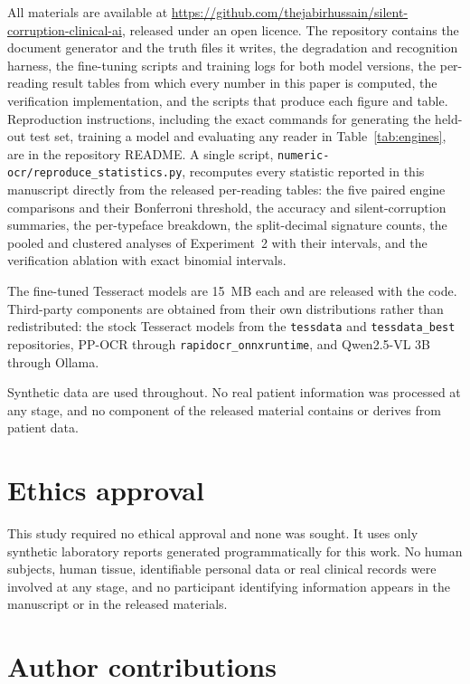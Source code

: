 \documentclass[11pt]{article}
\newif\ifanon
\begin{document}
\ifanon
All materials are provided through an anonymised repository link with the submission.
\else
All materials are available at
\url{https://github.com/thejabirhussain/silent-corruption-clinical-ai}, released under an open
licence. The repository contains the document generator and the truth files it writes, the
degradation and recognition harness, the fine-tuning scripts and training logs for both model
versions, the per-reading result tables from which every number in this paper is computed, the
verification implementation, and the scripts that produce each figure and table. Reproduction
instructions, including the exact commands for generating the held-out test set, training a
model and evaluating any reader in Table~\ref{tab:engines}, are in the repository README.
A single script, \texttt{numeric-ocr/reproduce\_statistics.py}, recomputes every statistic
reported in this manuscript directly from the released per-reading tables: the five paired
engine comparisons and their Bonferroni threshold, the accuracy and silent-corruption summaries,
the per-typeface breakdown, the split-decimal signature counts, the pooled and clustered
analyses of Experiment~2 with their intervals, and the verification ablation with exact binomial
intervals.

The fine-tuned Tesseract models are 15~MB each and are released with the code. Third-party
components are obtained from their own distributions rather than redistributed: the stock
Tesseract models from the \texttt{tessdata} and \texttt{tessdata\_best} repositories, PP-OCR
through \texttt{rapidocr\_onnxruntime}, and Qwen2.5-VL 3B through Ollama.
\fi

Synthetic data are used throughout. No real patient information was processed at any stage, and
no component of the released material contains or derives from patient data.

\section*{Ethics approval}

This study required no ethical approval and none was sought. It uses only synthetic laboratory
reports generated programmatically for this work. No human subjects, human tissue, identifiable
personal data or real clinical records were involved at any stage, and no participant
identifying information appears in the manuscript or in the released materials.

\section*{Author contributions}
\end{document}
